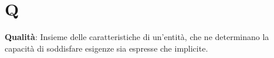 \section{Q}
\textbf{Qualità}: Insieme delle caratteristiche di un'entità, che ne determinano la capacità di soddisfare esigenze sia espresse che implicite.\\